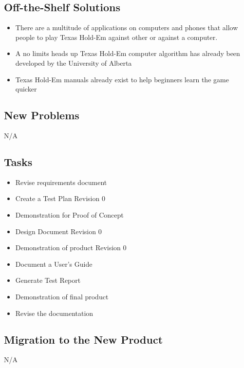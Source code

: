 \documentclass[12pt]{article}
\begin{document}
	\subsection{Off-the-Shelf Solutions}
	\begin{itemize}
	\item	There are a multitude of applications on computers and phones that allow people 			to play Texas Hold-Em against other or against a computer. 
	\item	A no limits heads up Texas Hold-Em computer algorithm has already been developed 			by the University of Alberta
	\item	Texas Hold-Em manuals already exist to help beginners learn the game quicker
	\end{itemize}
	\subsection{New Problems}
	N/A
	\subsection{Tasks}
	\begin{itemize}	
	\item 	Revise requirements document
	\item 	Create a Test Plan Revision 0 
	\item 	Demonstration for Proof of Concept
	\item 	Design Document Revision 0
	\item 	Demonstration of product Revision 0
	\item 	Document a User’s Guide 
	\item 	Generate Test Report 
	\item 	Demonstration of final product
	\item 	Revise the documentation
	\end{itemize}
	\subsection{Migration to the New Product}
	N/A
\end{document}
